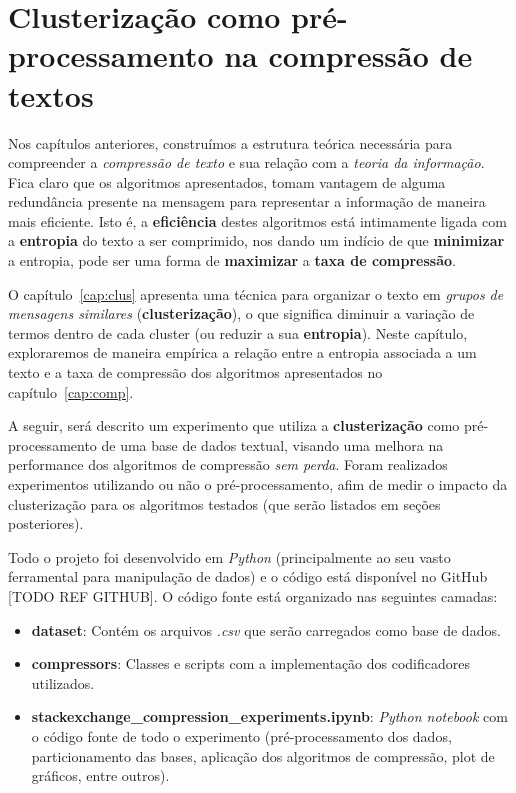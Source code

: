 \chapter{Clusterização como pré-processamento na compressão de textos}
Nos capítulos anteriores, construímos a estrutura teórica necessária para compreender a \emph{compressão de texto} e sua relação com a \emph{teoria da informação}.
Fica claro que os algoritmos apresentados, tomam vantagem de alguma redundância presente na mensagem para representar a informação de maneira mais eficiente.
Isto é, a \textbf{eficiência} destes algoritmos está intimamente ligada com a \textbf{entropia} do texto a ser comprimido,
 nos dando um indício de que \textbf{minimizar} a entropia, pode ser uma forma de \textbf{maximizar} a \textbf{taxa de compressão}.
 
O capítulo~\ref{cap:clus} apresenta uma técnica para organizar o texto em \emph{grupos de mensagens similares} (\textbf{clusterização}), o que significa diminuir a variação de termos dentro de cada cluster (ou reduzir a sua \textbf{entropia}).
Neste capítulo, exploraremos de maneira empírica a relação entre a entropia associada a um texto e a taxa de compressão dos algoritmos apresentados no capítulo~\ref{cap:comp}.

A seguir, será descrito um experimento que utiliza a \textbf{clusterização} como pré-processamento de uma base de dados textual, visando uma melhora na performance dos algoritmos de compressão \emph{sem perda}.
Foram realizados experimentos utilizando ou não o pré-processamento, afim de medir o impacto da clusterização para os algoritmos testados (que serão listados em seções posteriores).

Todo o projeto foi desenvolvido em \emph{Python} (principalmente ao seu vasto ferramental para manipulação de dados) e o código está disponível no GitHub [TODO REF GITHUB].
O código fonte está organizado nas seguintes camadas:
\begin{itemize}
	\item \textbf{dataset}: Contém os arquivos \emph{.csv} que serão carregados como base de dados.
	\item \textbf{compressors}: Classes e scripts com a implementação dos codificadores utilizados.
	\item \textbf{stackexchange\_compression\_experiments.ipynb}: \emph{Python notebook} com o código fonte de todo o experimento (pré-processamento dos dados, particionamento das bases, aplicação dos algoritmos de compressão, plot de gráficos, entre outros).
\end{itemize}
\pagebreak

